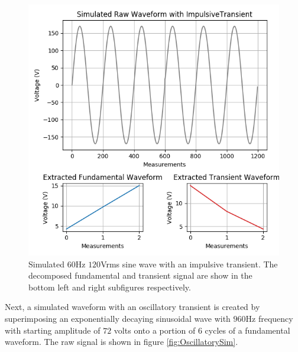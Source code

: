 \documentclass[10pt, conference, compsocconf]{IEEEtran}
\begin{document}
\begin{figure}[h]
\centering%
\includegraphics[scale=0.35]{./figures/impulsive_sim.png}
\caption{Simulated $60$Hz $120$Vrms sine wave with an impulsive transient. The decomposed fundamental and transient signal are show in the bottom left and right subfigures respectively.}\label{fig:ImpulsiveSim}
\end{figure}

Next, a simulated waveform with an oscillatory transient is created by superimposing an exponentially decaying sinusoidal wave with $960$Hz frequency with starting amplitude of $72$ volts onto a portion of $6$ cycles of a fundamental waveform. The raw signal is shown in figure \ref{fig:OscillatorySim}.
\end{document}
